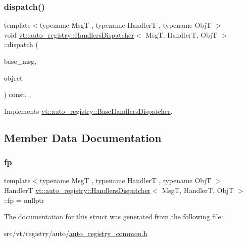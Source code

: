 \subsubsection{\texorpdfstring{dispatch()}{dispatch()}}
{\footnotesize\ttfamily template$<$typename MsgT , typename HandlerT , typename ObjT $>$ \\
void \hyperlink{structvt_1_1auto__registry_1_1_handlers_dispatcher}{vt\+::auto\+\_\+registry\+::\+Handlers\+Dispatcher}$<$ MsgT, HandlerT, ObjT $>$\+::dispatch (\begin{DoxyParamCaption}\item[{\hyperlink{structvt_1_1messaging_1_1_base_msg}{messaging\+::\+Base\+Msg} $\ast$}]{base\+\_\+msg,  }\item[{void $\ast$}]{object }\end{DoxyParamCaption}) const\hspace{0.3cm}{\ttfamily [inline]}, {\ttfamily [override]}, {\ttfamily [virtual]}}



Implements \hyperlink{structvt_1_1auto__registry_1_1_base_handlers_dispatcher_aefc05db879ce57b3ea0295afa56aa819}{vt\+::auto\+\_\+registry\+::\+Base\+Handlers\+Dispatcher}.



\subsection{Member Data Documentation}
\mbox{\label{structvt_1_1auto__registry_1_1_handlers_dispatcher_a2fe52dbcfedb744c43a0579de7c7167f}} 
\subsubsection{\texorpdfstring{fp}{fp}}
{\footnotesize\ttfamily template$<$typename MsgT , typename HandlerT , typename ObjT $>$ \\
HandlerT \hyperlink{structvt_1_1auto__registry_1_1_handlers_dispatcher}{vt\+::auto\+\_\+registry\+::\+Handlers\+Dispatcher}$<$ MsgT, HandlerT, ObjT $>$\+::fp = nullptr\hspace{0.3cm}{\ttfamily [private]}}



The documentation for this struct was generated from the following file\+:\begin{DoxyCompactItemize}
\item 
src/vt/registry/auto/\hyperlink{auto__registry__common_8h}{auto\+\_\+registry\+\_\+common.\+h}\end{DoxyCompactItemize}
